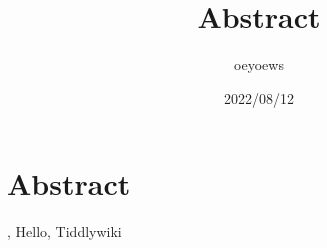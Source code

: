 \documentclass[UTF8]{article}
\title{Abstract \emoji{rocket}}
\author{oeyoews}
\date{2022/08/12}
\begin{document}
\maketitle

\section{Abstract }%
\label{sec:emoji}

, Hello, Tiddlywiki
\end{document}
